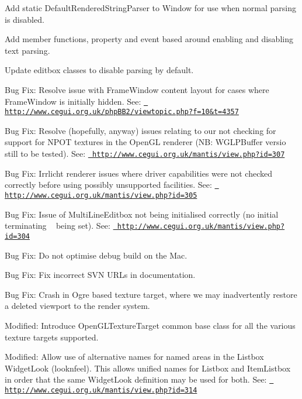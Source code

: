 \begin{DoxyItemize}
\begin{DoxyItemize}
\item Add static Default\+Rendered\+String\+Parser to Window for use when normal parsing is disabled.
\item Add member functions, property and event based around enabling and disabling text parsing.
\item Update editbox classes to disable parsing by default.
\end{DoxyItemize}
\item Bug Fix\+: Resolve issue with Frame\+Window content layout for cases where Frame\+Window is initially hidden. See\+: \href{http://www.cegui.org.uk/phpBB2/viewtopic.php?f=10&t=4357}{\texttt{ http\+://www.\+cegui.\+org.\+uk/php\+B\+B2/viewtopic.\+php?f=10\&t=4357}}
\item Bug Fix\+: Resolve (hopefully, anyway) issues relating to our not checking for support for N\+P\+OT textures in the Open\+GL renderer (NB\+: W\+G\+L\+P\+Buffer versio still to be tested). See\+: \href{http://www.cegui.org.uk/mantis/view.php?id=307}{\texttt{ http\+://www.\+cegui.\+org.\+uk/mantis/view.\+php?id=307}}
\item Bug Fix\+: Irrlicht renderer issues where driver capabilities were not checked correctly before using possibly unsupported facilities. See\+: \href{http://www.cegui.org.uk/mantis/view.php?id=305}{\texttt{ http\+://www.\+cegui.\+org.\+uk/mantis/view.\+php?id=305}}
\item Bug Fix\+: Issue of Multi\+Line\+Editbox not being initialised correctly (no initial terminating ~\newline
 being set). See\+: \href{http://www.cegui.org.uk/mantis/view.php?id=304}{\texttt{ http\+://www.\+cegui.\+org.\+uk/mantis/view.\+php?id=304}}
\item Bug Fix\+: Do not optimise debug build on the Mac.
\item Bug Fix\+: Fix incorrect S\+VN U\+R\+Ls in documentation.
\item Bug Fix\+: Crash in Ogre based texture target, where we may inadvertently restore a deleted viewport to the render system.
\item Modified\+: Introduce Open\+G\+L\+Texture\+Target common base class for all the various texture targets supported.
\item Modified\+: Allow use of alternative names for named areas in the Listbox Widget\+Look (looknfeel). This allows unified names for Listbox and Item\+Listbox in order that the same Widget\+Look definition may be used for both. See\+: \href{http://www.cegui.org.uk/mantis/view.php?id=314}{\texttt{ http\+://www.\+cegui.\+org.\+uk/mantis/view.\+php?id=314}}

\end{DoxyItemize}
